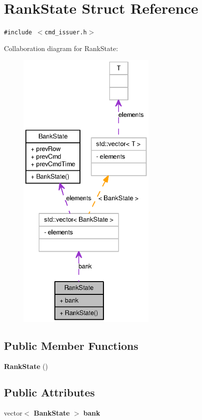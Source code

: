 \section{RankState Struct Reference}
\label{structRankState}
{\tt \#include $<$cmd\_\-issuer.h$>$}

Collaboration diagram for RankState:\nopagebreak
\begin{figure}[H]
\begin{center}
\leavevmode
\includegraphics[height=400pt]{structRankState__coll__graph}
\end{center}
\end{figure}
\subsection*{Public Member Functions}
\begin{CompactItemize}
\item 
{\bf RankState} ()
\end{CompactItemize}
\subsection*{Public Attributes}
\begin{CompactItemize}
\item 
vector$<$ {\bf BankState} $>$ {\bf bank}
\end{CompactItemize}


